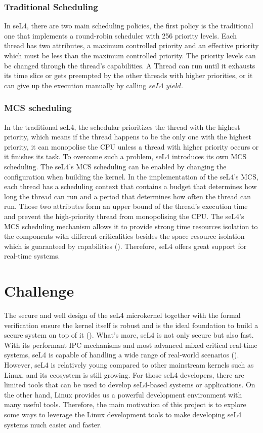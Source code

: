 \subsubsection{Traditional Scheduling}

In seL4, there are two main scheduling policies, the first policy is the traditional one that implements a round-robin scheduler with 256 priority levels. Each thread has two attributes, a maximum controlled priority and an effective priority which must be less than the maximum controlled priority. The priority levels can be changed through the thread's capabilities. A Thread can run until it exhausts its time slice or gets preempted by the other threads with higher priorities, or it can give up the execution manually by calling $seL4\_yield$.

\subsubsection{MCS scheduling}

In the traditional seL4, the schedular prioritizes the thread with the highest priority, which means if the thread happens to be the only one with the highest priority, it can monopolise the CPU unless a thread with higher priority occurs or it finishes its task. To overcome such a problem, seL4 introduces its own MCS scheduling. The seL4's MCS scheduling can be enabled by changing the configuration when building the kernel. In the implementation of the seL4's MCS, each thread has a scheduling context that contains a budget that determines how long the thread can run and a period that determines how often the thread can run. Those two attributes form an upper bound of the thread's execution time and prevent the high-priority thread from monopolising the CPU. The seL4's MCS scheduling mechanism allows it to provide strong time resources isolation to the components with different criticalities besides the space resource isolation which is guaranteed by capabilities (\cite{Lyons_MAH_18}). Therefore, seL4 offers great support for real-time systems.

\section{Challenge}

The secure and well design of the seL4 microkernel together with the formal verification ensure the kernel itself is robust and is the ideal foundation to build a secure system on top of it (\cite{Klein_AEHCDEEKNSTW_10}). What's more, seL4 is not only secure but also fast. With its performant IPC mechanisms and most advanced mixed critical real-time systems, seL4 is capable of handling a wide range of real-world scenarios (\cite{Heiser_KA_20}). However, seL4 is relatively young compared to other mainstream kernels such as Linux, and its ecosystem is still growing. For those seL4 developers, there are limited tools that can be used to develop seL4-based systems or applications. On the other hand, Linux provides us a powerful development environment with many useful tools. Therefore, the main motivation of this project is to explore some ways to leverage the Linux development tools to make developing seL4 systems much easier and faster.

